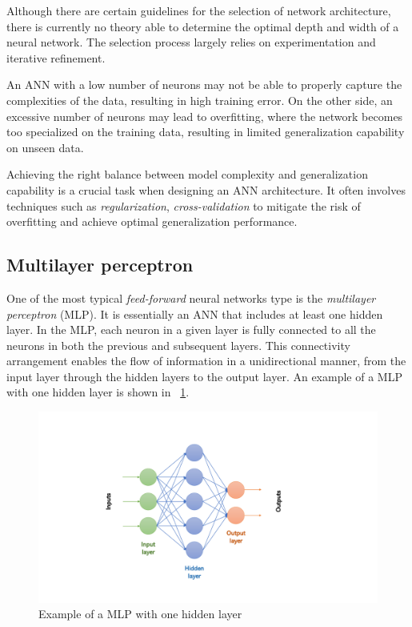 Although there are certain guidelines for the selection of network architecture, there is currently no theory able to determine the optimal depth and width of a neural network. The selection process largely relies on experimentation and iterative refinement.

An ANN with a low number of neurons may not be able to properly capture the complexities of the data, resulting in high training error. On the other side, an excessive number of neurons may lead to overfitting, where the network becomes too specialized on the training data, resulting in limited generalization capability on unseen data.

Achieving the right balance between model complexity and generalization capability is a crucial task when designing an ANN architecture. It often involves techniques such as \textit{regularization}, \textit{cross-validation} to mitigate the risk of overfitting and achieve optimal generalization performance.

\subsection{Multilayer perceptron}

One of the most typical \textit{feed-forward} neural networks type is the \textit{multilayer perceptron} (MLP). It is essentially an ANN that includes at least one hidden layer. In the MLP, each neuron in a given layer is fully connected to all the neurons in both the previous and subsequent layers. This connectivity arrangement enables the flow of information in a unidirectional manner, from the input layer through the hidden layers to the output layer.  An example of a MLP with one hidden layer is shown in \Fig~\ref{fig:mlp}.

\begin{figure}[h]
	\centering
	\includegraphics[width=0.9\linewidth]{ImageFiles/NeuralNetworks/mlp}
	\caption{Example of a MLP with one hidden layer}
	\label{fig:mlp}
\end{figure}

